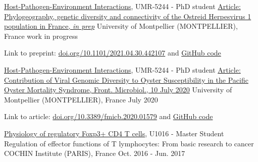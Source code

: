 

\begin{cventries}

  \cventry
    {\href{http://ihpe.univ-perp.fr/}{Host-Pathogen-Environment Interactions}, UMR-5244 - PhD student} %
    {\href{}{Article: Phylogeography, genetic diversity and connectivity of the Ostreid Herpesvirus 1 population in France, \textit{in prep}}} %
    {University of Montpellier (MONTPELLIER), France} %
    {work in progress} %
    {
      \begin{cvitems} %
      \item Link to preprint: {\href{https://doi.org/10.1101/2021.04.30.442107}{doi.org/10.1101/2021.04.30.442107} and \href{https://github.com/propan2one/OshV-1-molepidemio}{GitHub code}}
      \end{cvitems}
    }

  \cventry
    {\href{http://ihpe.univ-perp.fr/}{Host-Pathogen-Environment Interactions}, UMR-5244 - PhD student} %
    {\href{https://doi.org/10.3389/fmicb.2020.01579}{Article: Contribution of Viral Genomic Diversity to Oyster Susceptibility in the Pacific Oyster Mortality Syndrome, Front. Microbiol., 10 July 2020}} %
    {University of Montpellier (MONTPELLIER), France} %
    {July 2020} %
    {
      \begin{cvitems} %
        \item Link to article: {\href{https://doi.org/10.3389/fmicb.2020.01579}{doi.org/10.3389/fmicb.2020.01579} and \href{https://github.com/IHPE/DivOsHV}{GitHub code}}
      \end{cvitems}
    }

  \cventry
    {\href{https://www.institutcochin.fr/departments/3i/team-lucas/physiology-of-regulatory-foxp3-cd4-t-cells}{Physiology of regulatory Foxp3+ CD4 T cells}, U1016 - Master Student}%
    {Regulation of effector functions of T lymphocytes: From basic research to cancer} %
    {COCHIN Institute (PARIS), France} %
    {Oct. 2016 - Jun. 2017} %
    {
      \begin{cvitems} %
      \end{cvitems}
    }


\end{cventries}
